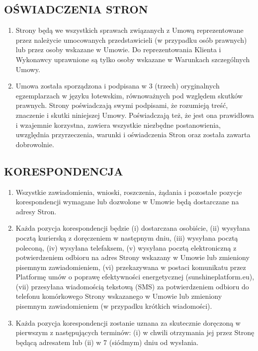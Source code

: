 \begin{multicols}{2}
\subsection{OŚWIADCZENIA STRON}
\begin{enumerate}
	\item Strony będą we wszystkich sprawach związanych z Umową reprezentowane przez należycie umocowanych przedstawicieli (w przypadku osób prawnych) lub przez osoby wskazane w Umowie. Do reprezentowania Klienta i Wykonawcy uprawnione są tylko osoby wskazane w Warunkach szczególnych Umowy.
	\item Umowa została sporządzona i podpisana w 3 (trzech) oryginalnych egzemplarzach w języku łotewskim, równoważnych pod względem skutków prawnych. Strony poświadczają swymi podpisami, że rozumieją treść, znaczenie i skutki niniejszej Umowy. Poświadczają też, że jest ona prawidłowa i wzajemnie korzystna, zawiera wszystkie niezbędne postanowienia, uwzględnia przyrzeczenia, warunki i oświadczenia Stron oraz została zawarta dobrowolnie.
\end{enumerate}


\subsection{KORESPONDENCJA}
\begin{enumerate}
	\item Wszystkie zawiadomienia, wnioski, roszczenia, żądania i pozostałe pozycje korespondencji wymagane lub dozwolone w Umowie będą dostarczane na adresy Stron.
	\item Każda pozycja korespondencji będzie (i) dostarczana osobiście, (ii) wysyłana pocztą kurierską z doręczeniem w następnym dniu, (iii) wysyłana pocztą poleconą, (iv) wysyłana telefaksem, (v) wysyłana pocztą elektroniczną z potwierdzeniem odbioru na adres Strony wskazany w Umowie lub zmieniony pisemnym zawiadomieniem, (vi) przekazywana w postaci komunikatu przez Platformę umów o poprawę efektywności energetycznej (sunshineplatform.eu), (vii) przesyłana wiadomością tekstową (SMS) za potwierdzeniem odbioru do telefonu komórkowego Strony wskazanego w Umowie lub zmieniony pisemnym zawiadomieniem (w przypadku krótkich wiadomości).
	\item Każda pozycja korespondencji zostanie uznana za skutecznie doręczoną w pierwszym z następujących terminów: (i) w chwili otrzymania jej przez Stronę będącą adresatem lub (ii) w 7 (siódmym) dniu od wysłania.
\end{enumerate}

\end{multicols}
